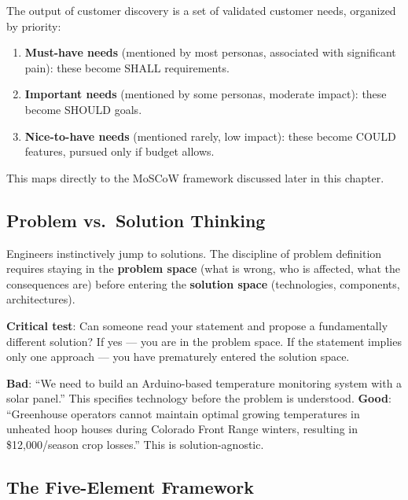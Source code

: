 \documentclass[11pt,letterpaper,twoside,openany]{book}
\begin{document}
\begin{keyconceptbox}
The output of customer discovery is a set of validated customer needs, organized by priority:
\begin{enumerate}[nosep]
\item \textbf{Must-have needs} (mentioned by most personas, associated with significant pain): these become SHALL requirements.
\item \textbf{Important needs} (mentioned by some personas, moderate impact): these become SHOULD goals.
\item \textbf{Nice-to-have needs} (mentioned rarely, low impact): these become COULD features, pursued only if budget allows.
\end{enumerate}
This maps directly to the MoSCoW framework discussed later in this chapter.
\end{keyconceptbox}

\subsection{Problem vs.\ Solution Thinking}
Engineers instinctively jump to solutions. The discipline of problem definition requires staying in the \textbf{problem space} (what is wrong, who is affected, what the consequences are) before entering the \textbf{solution space} (technologies, components, architectures).

\textbf{Critical test}: Can someone read your statement and propose a fundamentally different solution? If yes --- you are in the problem space. If the statement implies only one approach --- you have prematurely entered the solution space.

\begin{warningbox}
\textbf{Bad}: ``We need to build an Arduino-based temperature monitoring system with a solar panel.'' This specifies technology before the problem is understood. \textbf{Good}: ``Greenhouse operators cannot maintain optimal growing temperatures in unheated hoop houses during Colorado Front Range winters, resulting in \$12,000/season crop losses.'' This is solution-agnostic.
\end{warningbox}

\subsection{The Five-Element Framework}
\end{document}
